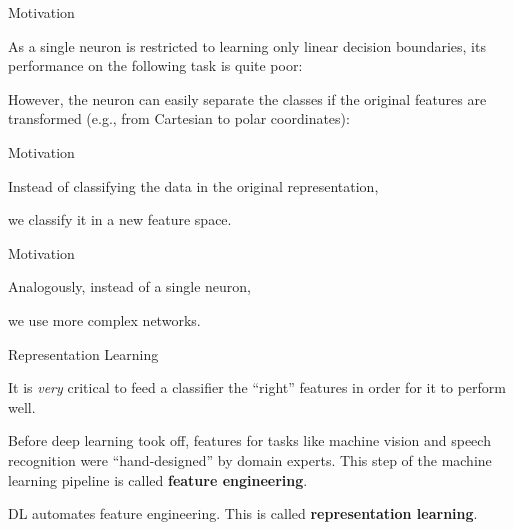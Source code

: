 \documentclass[11pt,compress,t,notes=noshow, xcolor=table]{beamer}
\begin{document}

\begin{framei}{Motivation}
\item As a single neuron is restricted to learning only linear decision boundaries, its performance on the following task is quite poor:
\item However, the neuron can easily separate the classes if the original features are transformed (e.g., from Cartesian to polar coordinates): 
\end{framei}

\begin{framei}{Motivation}
\item Instead of classifying the data in the original representation,
\item we classify it in a new feature space.
\end{framei}

\begin{framei}{Motivation}
\item Analogously, instead of a single neuron, 
\item we use more complex networks.
\end{framei}

\begin{framei}{Representation Learning}
    \item It is %
    \textit{very} critical to feed a classifier the \enquote{right} features in order for it to perform well.
    \item Before deep learning took off, features for tasks like machine vision and speech recognition were \enquote{hand-designed} by domain experts. This step of the machine learning pipeline is called \textbf{feature engineering}.
    \item %
     DL %
    automates feature engineering. This is called \textbf{representation learning}.
\end{framei}
\end{document}

